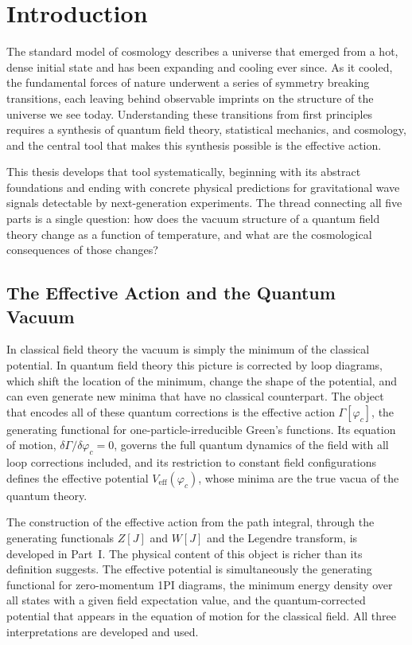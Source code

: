 \chapter{Introduction}
\label{ch:introduction}

The standard model of cosmology describes a universe that emerged from
a hot, dense initial state and has been expanding and cooling ever
since. As it cooled, the fundamental forces of nature underwent a
series of symmetry breaking transitions, each leaving behind
observable imprints on the structure of the universe we see today.
Understanding these transitions from first principles requires a
synthesis of quantum field theory, statistical mechanics, and
cosmology, and the central tool that makes this synthesis possible is
the effective action.

This thesis develops that tool systematically, beginning with its
abstract foundations and ending with concrete physical predictions for
gravitational wave signals detectable by next-generation experiments.
The thread connecting all five parts is a single question: how does
the vacuum structure of a quantum field theory change as a function of
temperature, and what are the cosmological consequences of those
changes?

\section*{The Effective Action and the Quantum Vacuum}

In classical field theory the vacuum is simply the minimum of the
classical potential. In quantum field theory this picture is
corrected by loop diagrams, which shift the location of the minimum,
change the shape of the potential, and can even generate new minima
that have no classical counterpart. The object that encodes all of
these quantum corrections is the effective action $\Gamma[\varphi_c]$,
the generating functional for one-particle-irreducible Green's
functions. Its equation of motion,
$\delta\Gamma/\delta\varphi_c = 0$, governs the full quantum dynamics
of the field with all loop corrections included, and its restriction
to constant field configurations defines the effective potential
$V_{\text{eff}}(\varphi_c)$, whose minima are the true vacua of the
quantum theory.

The construction of the effective action from the path integral,
through the generating functionals $Z[J]$ and $W[J]$ and the Legendre
transform, is developed in Part~I. The physical content of this object
is richer than its definition suggests. The effective potential is
simultaneously the generating functional for zero-momentum 1PI
diagrams, the minimum energy density over all states with a given
field expectation value, and the quantum-corrected potential that
appears in the equation of motion for the classical field. All three
interpretations are developed and used.

